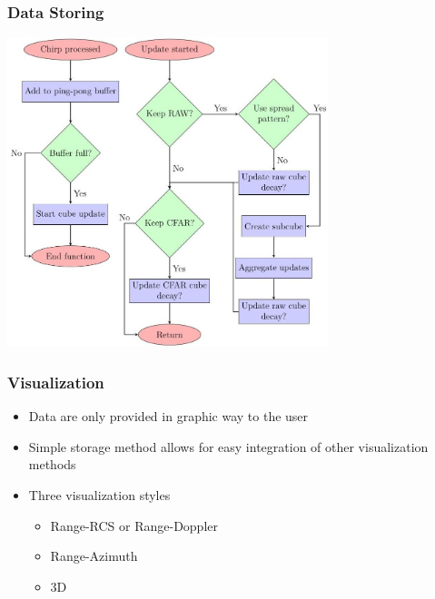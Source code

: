 \documentclass[aspectratio=43]{beamer}
\begin{document}
\begin{frame}[fragile]
  \frametitle{Data Storing}
  \begin{center}
    \includegraphics[width=0.7\textwidth]{../img/dataflow_3.jpg}
  \end{center}
\end{frame}

\begin{frame}[fragile]
  \frametitle{Visualization}
  \begin{itemize}
    \item Data are only provided in graphic way to the user
    \item Simple storage method allows for easy integration of other visualization methods
    \item Three visualization styles
      \begin{itemize}
        \item Range-RCS or Range-Doppler
        \item Range-Azimuth
        \item 3D
      \end{itemize}
  \end{itemize}
\end{frame}
\end{document}
